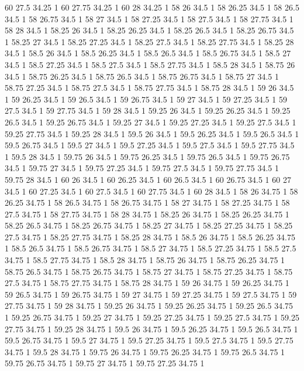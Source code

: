 60 27.5 34.25 1
60 27.75 34.25 1
60 28 34.25 1
58 26 34.5 1
58 26.25 34.5 1
58 26.5 34.5 1
58 26.75 34.5 1
58 27 34.5 1
58 27.25 34.5 1
58 27.5 34.5 1
58 27.75 34.5 1
58 28 34.5 1
58.25 26 34.5 1
58.25 26.25 34.5 1
58.25 26.5 34.5 1
58.25 26.75 34.5 1
58.25 27 34.5 1
58.25 27.25 34.5 1
58.25 27.5 34.5 1
58.25 27.75 34.5 1
58.25 28 34.5 1
58.5 26 34.5 1
58.5 26.25 34.5 1
58.5 26.5 34.5 1
58.5 26.75 34.5 1
58.5 27 34.5 1
58.5 27.25 34.5 1
58.5 27.5 34.5 1
58.5 27.75 34.5 1
58.5 28 34.5 1
58.75 26 34.5 1
58.75 26.25 34.5 1
58.75 26.5 34.5 1
58.75 26.75 34.5 1
58.75 27 34.5 1
58.75 27.25 34.5 1
58.75 27.5 34.5 1
58.75 27.75 34.5 1
58.75 28 34.5 1
59 26 34.5 1
59 26.25 34.5 1
59 26.5 34.5 1
59 26.75 34.5 1
59 27 34.5 1
59 27.25 34.5 1
59 27.5 34.5 1
59 27.75 34.5 1
59 28 34.5 1
59.25 26 34.5 1
59.25 26.25 34.5 1
59.25 26.5 34.5 1
59.25 26.75 34.5 1
59.25 27 34.5 1
59.25 27.25 34.5 1
59.25 27.5 34.5 1
59.25 27.75 34.5 1
59.25 28 34.5 1
59.5 26 34.5 1
59.5 26.25 34.5 1
59.5 26.5 34.5 1
59.5 26.75 34.5 1
59.5 27 34.5 1
59.5 27.25 34.5 1
59.5 27.5 34.5 1
59.5 27.75 34.5 1
59.5 28 34.5 1
59.75 26 34.5 1
59.75 26.25 34.5 1
59.75 26.5 34.5 1
59.75 26.75 34.5 1
59.75 27 34.5 1
59.75 27.25 34.5 1
59.75 27.5 34.5 1
59.75 27.75 34.5 1
59.75 28 34.5 1
60 26 34.5 1
60 26.25 34.5 1
60 26.5 34.5 1
60 26.75 34.5 1
60 27 34.5 1
60 27.25 34.5 1
60 27.5 34.5 1
60 27.75 34.5 1
60 28 34.5 1
58 26 34.75 1
58 26.25 34.75 1
58 26.5 34.75 1
58 26.75 34.75 1
58 27 34.75 1
58 27.25 34.75 1
58 27.5 34.75 1
58 27.75 34.75 1
58 28 34.75 1
58.25 26 34.75 1
58.25 26.25 34.75 1
58.25 26.5 34.75 1
58.25 26.75 34.75 1
58.25 27 34.75 1
58.25 27.25 34.75 1
58.25 27.5 34.75 1
58.25 27.75 34.75 1
58.25 28 34.75 1
58.5 26 34.75 1
58.5 26.25 34.75 1
58.5 26.5 34.75 1
58.5 26.75 34.75 1
58.5 27 34.75 1
58.5 27.25 34.75 1
58.5 27.5 34.75 1
58.5 27.75 34.75 1
58.5 28 34.75 1
58.75 26 34.75 1
58.75 26.25 34.75 1
58.75 26.5 34.75 1
58.75 26.75 34.75 1
58.75 27 34.75 1
58.75 27.25 34.75 1
58.75 27.5 34.75 1
58.75 27.75 34.75 1
58.75 28 34.75 1
59 26 34.75 1
59 26.25 34.75 1
59 26.5 34.75 1
59 26.75 34.75 1
59 27 34.75 1
59 27.25 34.75 1
59 27.5 34.75 1
59 27.75 34.75 1
59 28 34.75 1
59.25 26 34.75 1
59.25 26.25 34.75 1
59.25 26.5 34.75 1
59.25 26.75 34.75 1
59.25 27 34.75 1
59.25 27.25 34.75 1
59.25 27.5 34.75 1
59.25 27.75 34.75 1
59.25 28 34.75 1
59.5 26 34.75 1
59.5 26.25 34.75 1
59.5 26.5 34.75 1
59.5 26.75 34.75 1
59.5 27 34.75 1
59.5 27.25 34.75 1
59.5 27.5 34.75 1
59.5 27.75 34.75 1
59.5 28 34.75 1
59.75 26 34.75 1
59.75 26.25 34.75 1
59.75 26.5 34.75 1
59.75 26.75 34.75 1
59.75 27 34.75 1
59.75 27.25 34.75 1

